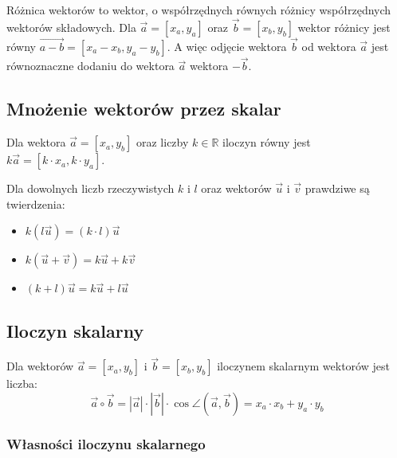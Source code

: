 \documentclass [a4paper, 12pt, oneside]{article}
\newcommand{\vect}[1]{\overrightarrow{#1}}
\begin{document}
Różnica wektorów to wektor, o współrzędnych równych różnicy współrzędnych wektorów składowych. Dla $\vect{a} = [x_a, y_a]$ oraz $\vect{b} = [x_b, y_b]$ wektor różnicy jest równy $\vect{a-b} = [x_a - x_b, y_a - y_b]$. A więc odjęcie wektora $\vect{b}$ od wektora $\vect{a}$ jest równoznaczne dodaniu do wektora $\vect{a}$ wektora $-\vect{b}$.

\subsection*{Mnożenie wektorów przez skalar}

Dla wektora $\vect{a} = [x_a, y_b]$ oraz liczby $k \in \mathbb{R}$ iloczyn równy jest $k\vect{a} = [k\cdot x_a, k\cdot y_a]$. 

Dla dowolnych liczb rzeczywistych $k$ i $l$ oraz wektorów $\vect u$ i $\vect v$ prawdziwe są twierdzenia:

\begin{itemize}
    \item $k\left(l\vect{u}\right) = (k\cdot l)\vect{u}$
    \item $k\left(\vect{u} + \vect{v}\right) = k\vect{u} + k\vect{v}$
    \item $(k+l)\vect{u} = k\vect{u} + l\vect{u}$
\end{itemize}

\subsection*{Iloczyn skalarny}

Dla wektorów $\vect a = [x_a, y_b]$ i $\vect b = [x_b, y_b]$ iloczynem skalarnym wektorów jest liczba:
\[
    \vect a \circ \vect b = \left| \vect a\right| \cdot \left| \vect b\right| \cdot \cos\angle
\left(\vect a, \vect b\right) = x_a \cdot x_b + y_a \cdot y_b
\]

\subsubsection*{Własności iloczynu skalarnego}
\end{document}
